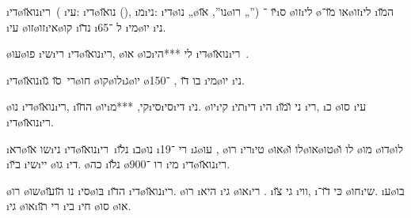 \newcommand{\dinozaurim}{\i{די}\o{נו}\u{או}\i{רי}\x{ם}}

\dinozaurim\ ( \i{עי}: \i{די}\o{נו}\u{או} (), \i{מ}\i{ני}:  \i{די}\o{נו} „\o{נו}”,  \u{או}\o{רו} „”) \u{יו} ־\i{ס}  \o{זו}\i{לי} \o{או} \u{מו}־\o{זו}\i{לי} \i{ה}\u{מו} \i{עי} \o{זו}\o{זו}\i{אי}\o{קו} \i{נ}\u{דו} \i{ל} ־65 \i{מי}\o{יו} \i{ני}.

\o{עו}\o{פו}   \i{שי}\i{רי}  \dinozaurim, \o{או}  \o{כו}\i{לי} ***הי \dinozaurim\ .

\dinozaurim\ \u{סו} \u{גו}\o{חו} \o{קו}\o{לו}\i{ג}\o{יו} \o{בו}   \u{דו} ,  ־150 \i{מי}\o{יו} \i{ני}.

\o{נו} \dinozaurim, \i{ה}\u{חו} \o{יו}\i{קי}, ***מ\i{סי}\i{סי}\i{די} \i{ני}. \o{יו}\i{קי} \i{תי}\i{די} \i{הי} \i{ני} \u{ו}\u{מו} \i{רי}, \i{כ}  \o{סו} \i{עי} \dinozaurim.

\i{רא}\o{שו} \u{או}\i{ני}  \dinozaurim\ \i{נ}\u{לו} \i{ב}\o{נו} \i{רי}   ־19   \i{ג}\o{עו} , \o{רו} \i{רי}\i{טי}  \o{או}\o{לו} \u{ו}\o{או}\o{טו}\o{לו} \u{ו} \o{מו} \o{דו}\o{לו} \i{ב}\u{יו} \i{שי}\i{יי} \o{גו}  \i{די}.
 \o{כה} \i{נ}\u{לו} \o{רו} ־900 \i{מי} \dinozaurim.

\o{רו} \o{שו}\o{נו} \u{הו}\u{עו}  \i{סי}\o{בּו} \i{ה}\u{דו}  \dinozaurim. \o{רו}  \i{היא} \i{גי} \o{או}\i{רי} . \i{גי}     \u{צו} \i{ווי},  \i{כּי}  \u{דו}־      \o{חו}\i{שי}. \i{ע}\o{בו} \i{גי} \o{או}\i{רי} \u{תו} \i{בי} \i{חי}  \o{סו} \o{או}.

